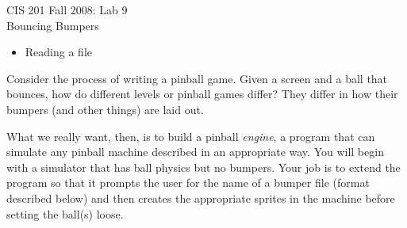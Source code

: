 \documentclass[12pt,oneside]{memoir}
\begin{document}
\begin{center}
\Large{CIS 201 Fall 2008: Lab 9\\Bouncing Bumpers}
\end{center}

\begin{itemize}
\item Reading a file
\end{itemize}

Consider the process of writing a pinball game. Given a screen and a
ball that bounces, how do different levels or pinball games differ?
They differ in how their bumpers (and other things) are laid out. 

What we really want, then, is to build a pinball \emph{engine}, a
program that can simulate any pinball machine described in an
appropriate way. You will begin with a simulator that has ball physics
but no bumpers. Your job is to extend the program so that it prompts
the user for the name of a bumper file (format described below) and
then creates the appropriate sprites in the machine before setting the
ball(s) loose.
\end{document}

